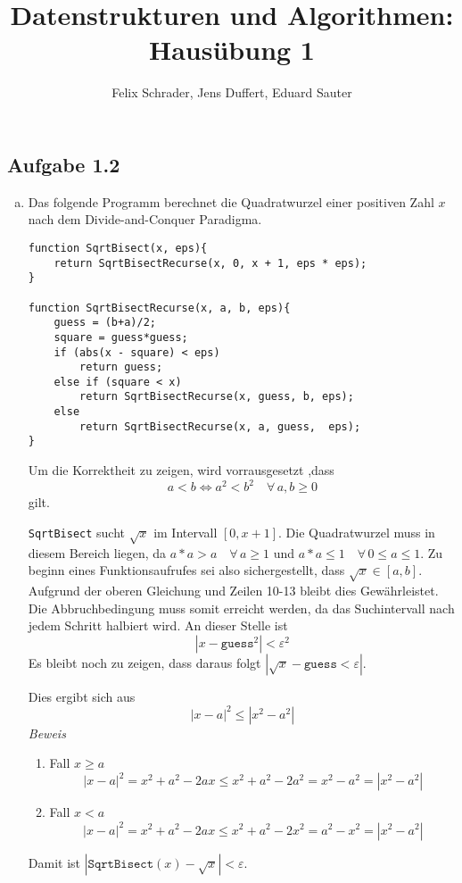 \documentclass[11pt]{article}
\author{Felix Schrader, Jens Duffert, Eduard Sauter}
\title{Datenstrukturen und Algorithmen: Haus\"ubung 1}
\newcommand{\abs}[1]{\left| #1 \right| }
\begin{document}
\maketitle

\subsection*{Aufgabe 1.2}
\begin{enumerate}[a)]
  \item 
    Das folgende Programm berechnet die Quadratwurzel einer positiven 
    Zahl $x$ nach dem Divide-and-Conquer Paradigma. 


    \begin{lstlisting}
function SqrtBisect(x, eps){
    return SqrtBisectRecurse(x, 0, x + 1, eps * eps);
}

function SqrtBisectRecurse(x, a, b, eps){
    guess = (b+a)/2;
    square = guess*guess;
    if (abs(x - square) < eps)
        return guess;
    else if (square < x)
        return SqrtBisectRecurse(x, guess, b, eps);
    else
        return SqrtBisectRecurse(x, a, guess,  eps);
}
  \end{lstlisting}

  Um die Korrektheit zu zeigen, wird vorrausgesetzt ,dass  
  \begin{equation}
    a < b \iff a^2 < b^2 \quad\forall\, a, b \ge 0
  \end{equation}
  gilt.

  \texttt{SqrtBisect} sucht $\sqrt{x}$ im Intervall $[0,x+1]$. Die Quadratwurzel
  muss in diesem Bereich liegen, da $a * a > a \quad\forall\, a \ge 1 $ und
  $a * a \le 1 \quad\forall\, 0 \le a \le 1$.
  Zu beginn eines Funktionsaufrufes sei also sichergestellt, dass $\sqrt{x} \in
  [a,b]$.  Aufgrund der oberen Gleichung und Zeilen 10-13 bleibt dies
  Gew\"ahrleistet. Die Abbruchbedingung muss somit erreicht werden, da das
  Suchintervall nach jedem Schritt halbiert wird. An dieser Stelle ist
  \begin{equation}
  | x - \texttt{guess}^2 | < \varepsilon^2
  \end{equation}
  Es bleibt noch zu zeigen, dass daraus folgt $\left| \sqrt{x} - \texttt{guess}
  < \varepsilon \right|$.

  Dies ergibt sich aus \[ \left| x-a \right|^2 \le \left| x^2 - a^2 \right|  \]  
  \emph{Beweis} 
  \begin{enumerate}
    \item Fall $x \ge a$
      \[ \abs{x-a}^2 = x^2 + a^2 - 2 ax \le x^2 + a^2 - 2 a^2 = x^2 -a^2 =
      \abs{x^2-a^2}  \] 
    \item Fall $x < a$
      \[ \abs{x-a}^2 = x^2 + a^2 - 2 ax \le x^2 + a^2 - 2 x^2 = a^2 -x^2 =
      \abs{x^2-a^2}  \] 
  \end{enumerate}
  Damit ist $\abs{ \texttt{SqrtBisect}(x)- \sqrt{x} } < \varepsilon$.



\end{enumerate}
\end{document}
